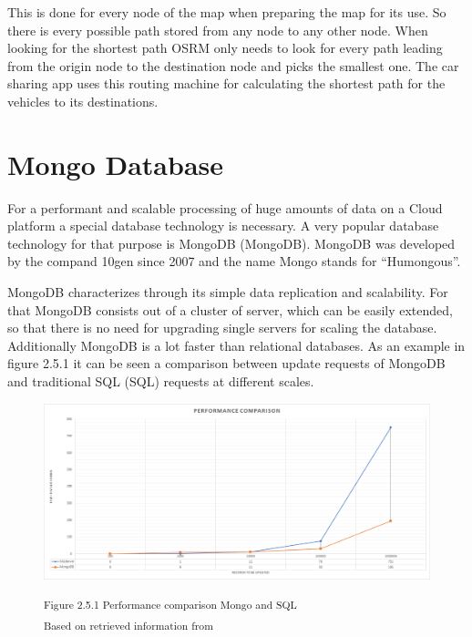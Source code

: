 
This is done for every node of the map when preparing the map for its use. So there is every possible path stored from any node to any other node. When looking for the shortest path OSRM only needs to look for every path leading from the origin node to the destination node and picks the smallest one. The car sharing app uses this routing machine for calculating the shortest path for the vehicles to its destinations.

\section{Mongo Database}

For a performant and scalable processing of huge amounts of data on a Cloud platform a special database technology is necessary. A very popular database technology for that purpose is \acs{MongoDB} (\acl{MongoDB}). MongoDB was developed by the compand 10gen since 2007 and the name Mongo stands for ``Humongous''. 


MongoDB characterizes through its simple data replication and scalability. For that MongoDB consists out of a cluster of server, which can be easily extended, so that there is no need for upgrading single servers for scaling the database. Additionally MongoDB is a lot faster than relational databases. As an example in figure 2.5.1 it can be seen a comparison between update requests of MongoDB and traditional \acs{SQL} (\acl{SQL}) requests at different scales.

\begin{figure}[h]
\centering
\includegraphics[width=\textwidth]{images/mongo_sql_comparison.png}

\textsuperscript{Figure 2.5.1 Performance comparison Mongo and SQL}\\
\textsuperscript{Based on retrieved information from \cite{}}
\end{figure}

